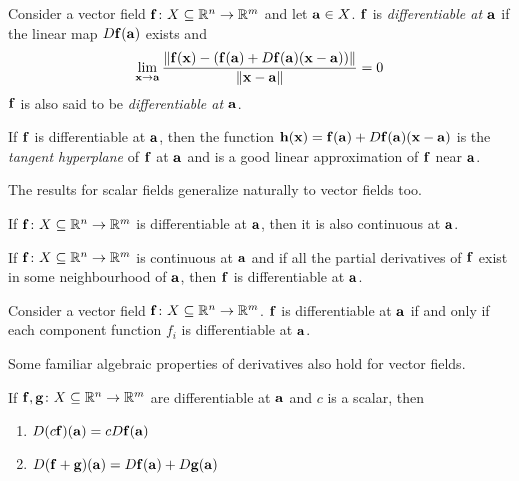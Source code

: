 \documentclass{article}
\begin{document}
\begin{definition}[Differentiability]
  Consider a vector field $\mathbf{f} \colon X \subseteq \mathbb{R}^n \to \mathbb{R}^m$ and let $\mathbf{a} \in X$.
  $\mathbf{f}$ is \emph{differentiable at $\mathbf{a}$} if the linear map $D\mathbf{f}(\mathbf{a})$ exists and
  \begin{align}
    \lim_{\mathbf{x} \to \mathbf{a}} \frac{\norm{\mathbf{f}(\mathbf{x}) - (\mathbf{f}(\mathbf{a}) + D\mathbf{f}(\mathbf{a})(\mathbf{x} - \mathbf{a}))}}{\norm{\mathbf{x} - \mathbf{a}}} = 0
  \end{align}
  $\mathbf{f}$ is also said to be \emph{differentiable at $\mathbf{a}$}.
\end{definition}
If $\mathbf{f}$ is differentiable at $\mathbf{a}$, then the function $\mathbf{h}(\mathbf{x}) = \mathbf{f}(\mathbf{a}) + D\mathbf{f}(\mathbf{a})(\mathbf{x} - \mathbf{a})$ is the \emph{tangent hyperplane} of $\mathbf{f}$ at $\mathbf{a}$ and is a good linear approximation of $\mathbf{f}$ near $\mathbf{a}$.

The results for scalar fields generalize naturally to vector fields too.

\begin{theorem}
  If $\mathbf{f} \colon X \subseteq \mathbb{R}^n \to \mathbb{R}^m$ is differentiable at $\mathbf{a}$, then it is also continuous at $\mathbf{a}$.
\end{theorem}

\begin{theorem}
  If $\mathbf{f} \colon X \subseteq \mathbb{R}^n \to \mathbb{R}^m$ is continuous at $\mathbf{a}$ and if all the partial derivatives of $\mathbf{f}$ exist in some neighbourhood of $\mathbf{a}$, then $\mathbf{f}$ is differentiable at $\mathbf{a}$.
\end{theorem}

\begin{theorem}
  Consider a vector field $\mathbf{f} \colon X \subseteq \mathbb{R}^n \to \mathbb{R}^m$.
  $\mathbf{f}$ is differentiable at $\mathbf{a}$ if and only if each component function $f_i$ is differentiable at $\mathbf{a}$.
\end{theorem}

Some familiar algebraic properties of derivatives also hold for vector fields.

\begin{theorem}
  If $\mathbf{f}, \mathbf{g} \colon X \subseteq \mathbb{R}^n \to \mathbb{R}^m$ are differentiable at $\mathbf{a}$ and $c$ is a scalar, then
  \begin{enumerate}
    \item $D(c\mathbf{f})(\mathbf{a}) = cD\mathbf{f}(\mathbf{a})$
    \item $D(\mathbf{f} + \mathbf{g})(\mathbf{a}) = D\mathbf{f}(\mathbf{a}) + D\mathbf{g}(\mathbf{a})$
  \end{enumerate}
\end{theorem}
\end{document}

